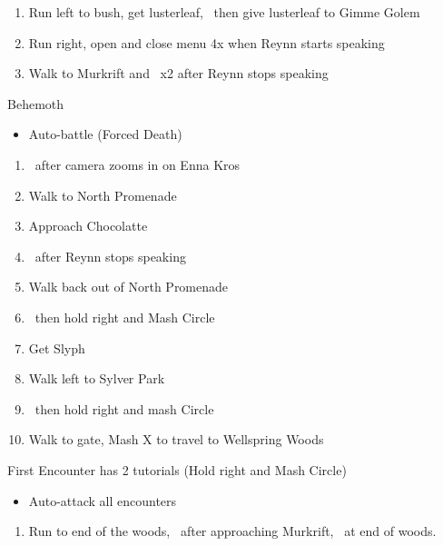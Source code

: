 \begin{enumerate}[resume]
	\item Run left to bush, get lusterleaf, \cs\ then give lusterleaf to Gimme Golem
	\item Run right, open and close menu 4x when Reynn starts speaking
	\item Walk to Murkrift and \cs\ x2 after Reynn stops speaking
\end{enumerate}
\begin{battle}[]{Behemoth}
	\begin{itemize}
		\item Auto-battle (Forced Death)
	\end{itemize}
\end{battle}
\begin{enumerate}[resume]
	\item \cs\ after camera zooms in on Enna Kros
	\item Walk to North Promenade
	\item Approach Chocolatte
	\item \cs\ after Reynn stops speaking
	\item Walk back out of North Promenade
	\item \cs\ then hold right and Mash Circle
	\item Get Slyph
	\item Walk left to Sylver Park
	\item \cs\ then hold right and mash Circle
	\item Walk to gate, Mash X to travel to Wellspring Woods
\end{enumerate}
\begin{encounters}
First Encounter has 2 tutorials (Hold right and Mash Circle)
	\begin{itemize}
		\item Auto-attack all encounters
	\end{itemize}
\end{encounters}
\begin{enumerate}[resume]
	\item Run to end of the woods, \cs\ after approaching Murkrift, \unskippablecs\ at end of woods.
\end{enumerate}